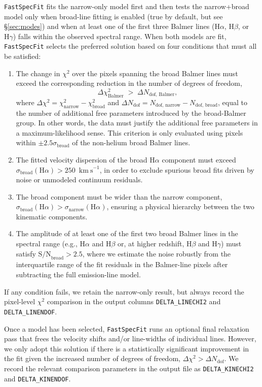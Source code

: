 \documentclass[modern,linenumbers]{aastex702}
\newcommand{\fastspecfit}{\texttt{FastSpecFit}}
\newcommand{\kms}{\ensuremath{\mathrm{km~s}^{-1}}}
\newcommand{\ha}{\ensuremath{\mathrm{H}\alpha}}
\newcommand{\hb}{\ensuremath{\mathrm{H}\beta}}
\newcommand{\hg}{\ensuremath{\mathrm{H}\gamma}}
\begin{document}
\fastspecfit{} fits the narrow-only model first and then tests the
narrow+broad model only when broad-line fitting is enabled (true by
default, but see \S\ref{sec:modes}) and when at least one of the first
three Balmer lines (\ha, \hb, or \hg) falls within the observed
spectral range. When both models are fit, \fastspecfit{} selects the
preferred solution based on four conditions that must all be
satisfied:
\begin{enumerate}

\item{The change in $\chi^2$ over the pixels spanning the broad Balmer
  lines must exceed the corresponding reduction in the number of
  degrees of freedom,
\begin{equation}
  \Delta\chi^2_\mathrm{Balmer} \;>\; \Delta N_\mathrm{dof,\,Balmer},
  \label{eq:broadchi2}
\end{equation}
where $\Delta\chi^2 = \chi^2_\mathrm{narrow} - \chi^2_\mathrm{broad}$
and $\Delta N_\mathrm{dof} = N_\mathrm{dof,\,narrow} -
N_\mathrm{dof,\,broad}$, equal to the number of additional free
parameters introduced by the broad-Balmer group. In other words, the
data must justify the additional free parameters in a
maximum-likelihood sense. This criterion is only evaluated using
pixels within $\pm 2.5\sigma_\mathrm{broad}$ of the non-helium broad
Balmer lines.}
\item{The fitted velocity dispersion of the broad \ha{} component must
  exceed $\sigma_\mathrm{broad}(\ha) > 250$~\kms, in order to exclude
  spurious broad fits driven by noise or unmodeled continuum
  residuals.}
\item{The broad component must be wider than the narrow component,
  $\sigma_\mathrm{broad}(\ha) > \sigma_\mathrm{narrow}(\ha)$, ensuring
  a physical hierarchy between the two kinematic components.}
\item{The amplitude of at least one of the first two broad Balmer
  lines in the spectral range (e.g., \ha{} and \hb{} or, at higher
  redshift, \hb{} and \hg) must satisfy $\mathrm{S/N}_\mathrm{broad} >
  2.5$, where we estimate the noise robustly from the interquartile
  range of the fit residuals in the Balmer-line pixels after
  subtracting the full emission-line model.}
\end{enumerate}
If any condition fails, we retain the narrow-only result, but always
record the pixel-level $\chi^2$ comparison in the output columns
\texttt{DELTA\_LINECHI2} and \texttt{DELTA\_LINENDOF}.

Once a model has been selected, \fastspecfit{} runs an optional final
relaxation pass that frees the velocity shifts and/or line-widths of
individual lines. However, we only adopt this solution if there is a
statistically significant improvement in the fit given the increased
number of degrees of freedom, $\Delta\chi^2 > \Delta
N_\mathrm{dof}$. We record the relevant comparison parameters in the
output file as \texttt{DELTA\_KINECHI2} and \texttt{DELTA\_KINENDOF}.
\end{document}

